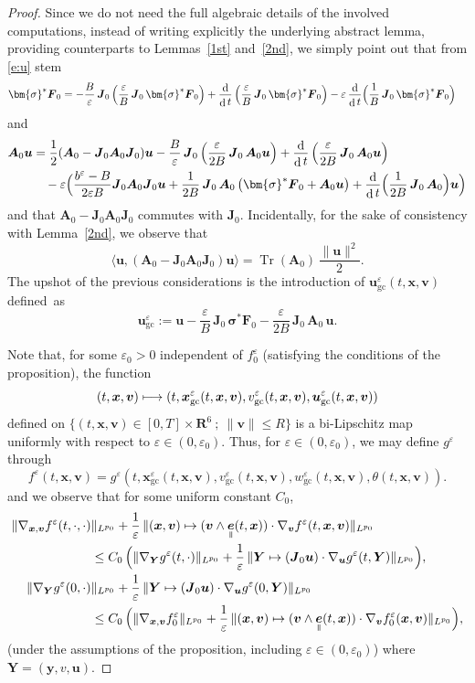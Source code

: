 \documentclass[10pt]{amsart}
\newcommand\mto{\mathchoice{\longmapsto}{\mapsto}{\mapsto}{\mapsto}}
\newcommand{\sep}{\ ;\ }
\let\eps\varepsilon
\DeclareMathOperator\dD{d}\let\dd\dD
\DeclareMathOperator{\Tr}{Tr}
\theoremstyle{plain}
\theoremstyle{definition}
\newcommand{\be}{\begin{equation}}
\newcommand{\ee}{\end{equation}}
\newcommand\R{\mathbf R}
\newcommand\bA{{\boldsymbol A}}
\newcommand\bF{{\boldsymbol F}}
\newcommand\bJ{{\boldsymbol J}}
\newcommand\bY{{\boldsymbol Y}}
\newcommand\bfu{{\boldsymbol u}}
\newcommand\bfv{{\boldsymbol v}}
\newcommand\bfx{{\boldsymbol x}}
\newcommand\bfy{{\boldsymbol y}}
\newcommand\bfsigma{\bm{\sigma}}
\DeclareMathOperator{\beD}{\boldsymbol{e}}
\newcommand\eDpar{\beD_\mypar}
\newcommand{\GC}{\bfx_\mathrm{gc}}
\newcommand{\eGC}{w_\mathrm{gc}}
\newcommand{\vGC}{v_\mathrm{gc}}
\newcommand{\uGC}{\bfu_\mathrm{gc}}
\newcommand{\mypar}{{\mkern3mu\vphantom{\perp}\vrule depth 0pt\mkern2mu\vrule depth 0pt\mkern3mu}}
\begin{document}
\begin{proof}
Since we do not need the full algebraic details of the involved computations, instead of writing explicitly the underlying abstract lemma, providing counterparts to Lemmas~\ref{1st} and~\ref{2nd}, we simply point out that from \eqref{e:u} stem
\begin{align*}
\bfsigma^*\bF_0
&=-\frac{B}{\eps}\, \bJ_0\left(\frac{\eps}{B}\,\bJ_0\,\bfsigma^*\bF_0\right)
+\frac{\dD}{\dD t}\left(\frac{\eps}{B}\,\bJ_0\,\bfsigma^*\bF_0\right)
-\eps\,\frac{\dD}{\dD t}\Bigl(\frac{1}{B}\,\bJ_0\,\bfsigma^*\bF_0\Bigr)
\end{align*}
and
\begin{align*}
\bA_0\bfu
&=\frac12(\bA_0-\bJ_0\bA_0\bJ_0)\bfu
-\frac{B}{\eps}\, \bJ_0\left(\frac{\eps}{2B}\,\bJ_0\,\bA_0\bfu\right)
+\frac{\dD}{\dD t}\left(\frac{\eps}{2B}\,\bJ_0\,\bA_0\bfu\right)\\
&\quad
-\eps\Bigl(\frac{b^\eps-B}{2\eps B}\bJ_0\bA_0\bJ_0\bfu
+\frac{1}{2B}\,\bJ_0\,\bA_0\left(\bfsigma^*\bF_0+\bA_0\bfu\right)
+\frac{\dD}{\dD t}\Bigl(\frac{1}{2B}\,\bJ_0\,\bA_0\Bigr)\bfu\Bigr)
\end{align*}
and that $\bA_0-\bJ_0\bA_0\bJ_0$ commutes with $\bJ_0$. Incidentally, for the sake of consistency with Lemma~\ref{2nd}, we observe that\enlargethispage{\baselineskip}%
\[
\langle\bfu,(\bA_0-\bJ_0\bA_0\bJ_0)\bfu\rangle
=\Tr(\bA_0)\,\frac{\|\bfu\|^2}{2}.
\]
The upshot of the previous considerations is the introduction of $\uGC^\eps(t,\bfx,\bfv)$ defined~as%
\be\label{def:uGC}
\uGC^\eps
:=\bfu-\frac{\eps}{B}\,\bJ_0\,\bfsigma^*\bF_0-\frac{\eps}{2B}\,\bJ_0\,\bA_0\,\bfu.
\ee

Note that, for some $\eps_0>0$ independent of $f_0^\eps$ (satisfying the conditions of the proposition), the function
\[
(t,\bfx,\bfv)\mto (t,\GC^\eps(t,\bfx,\bfv),\vGC^\eps(t,\bfx,\bfv),\uGC^\eps(t,\bfx,\bfv))
\]
defined on $\{(t,\bfx,\bfv)\in[0,T]\times\R^6\sep \|\bfv\|\leq R\}$ is a bi-Lipschitz map uniformly with respect to $\eps\in(0,\eps_0)$. Thus, for $\eps\in(0,\eps_0)$, we may define $g^\eps$ through
\[
f^\eps(t,\bfx,\bfv)=g^\eps(t,\GC^\eps(t,\bfx,\bfv),\vGC^\eps(t,\bfx,\bfv),\eGC^\eps(t,\bfx,\bfv),\theta(t,\bfx,\bfv)).
\]
and we observe that for some uniform constant $C_0$,
\begin{align*}
\|\nabla_{\bfx,\bfv}f^\eps(t,\cdot,\cdot)&\|_{L^{p_0}}
+\frac{1}{\eps}\,\|(\bfx,\bfv)\mapsto (\bfv\wedge\eDpar(t,\bfx))\cdot\nabla_{\bfv}f^\eps(t,\bfx,\bfv)\|_{L^{p_0}}\\
&\leq
C_0\,\Bigl(
\|\nabla_{\bY}g^\eps(t,\cdot)\|_{L^{p_0}}
+\frac{1}{\eps}\,\|
\bY\mapsto (\bJ_0\bfu)\cdot\nabla_{\bfu}g^\eps(t,\bY)\|_{L^{p_0}}\Bigr),\\
\|\nabla_{\bY}g^\eps(0,\cdot)&\|_{L^{p_0}}
+\frac{1}{\eps}\,\|\bY\mapsto (\bJ_0\bfu)\cdot\nabla_{\bfu}g^\eps(0,\bY)\|_{L^{p_0}}\\
&\leq
C_0\,\Bigl(
\|\nabla_{\bfx,\bfv}f_0^\eps\|_{L^{p_0}}
+\frac{1}{\eps}\,\|(\bfx,\bfv)\mapsto (\bfv\wedge\eDpar(t,\bfx))\cdot\nabla_{\bfv}f_0^\eps(\bfx,\bfv)\|_{L^{p_0}}\Bigr),
\end{align*}
(under the assumptions of the proposition, including $\eps\in(0,\eps_0)$)
where $\bY=(\bfy,v,\bfu)$.


\end{proof}
\end{document}
